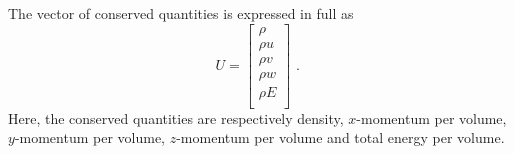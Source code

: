 The vector of conserved quantities is expressed in full as
\begin{equation}
 U = \left [ \begin{array}{c} \rho \\ 
                              \rho u \\ 
                              \rho v \\ 
                              \rho w \\ 
                              \rho E \\ 
             \end{array} \right ] \text{ . }
 \label{eq:U_vector_3D}
\end{equation}
Here, the conserved quantities are respectively density, $x$-momentum per volume,
$y$-momentum per volume, $z$-momentum per volume and total energy per volume.

